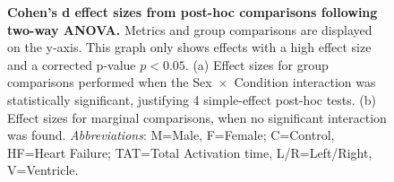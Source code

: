 
\begin{figure}[hbpt]
    \caption{
        \textbf{Cohen’s d effect sizes from post-hoc comparisons following two-way ANOVA.}
        Metrics and group comparisons are displayed on the y-axis.
        This graph only shows effects with a high effect size and a corrected p-value $p<0.05$. 
        (a) Effect sizes for group comparisons performed when the Sex~$\times$~Condition 
        interaction was statistically significant, justifying 4 simple-effect post-hoc tests.
        (b) Effect sizes for marginal comparisons, when no significant interaction was found.
        \textit{Abbreviations}: M=Male, F=Female; C=Control, HF=Heart Failure; TAT=Total Activation time, 
        L/R=Left/Right, V=Ventricle.
    }
    \label{fig:cohen-big-effects}
\end{figure}